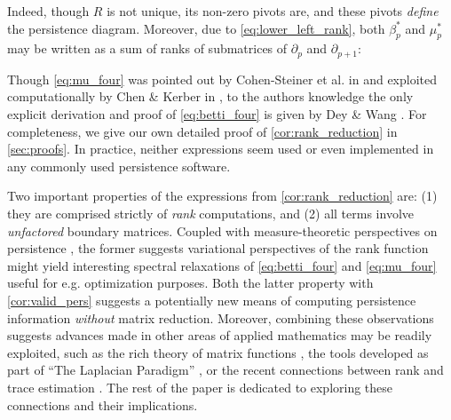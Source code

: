 \documentclass[pdflatex,sn-mathphys-num]{sn-jnl}
\begin{document}

Indeed, though \(R\) is not unique, its non-zero pivots are, and these pivots \emph{define} the persistence diagram. Moreover, due to \ref{eq:lower_left_rank}, both \(\beta_{p}^{\ast}\) and \(\mu_{p}^{\ast}\) may be written as a sum of ranks of submatrices of \(\partial_{p}\) and \(\partial_{p + 1}\):


Though \ref{eq:mu_four} was pointed out by Cohen-Steiner et al. in \cite{cohen2006vines} and exploited computationally by Chen \& Kerber in \cite{chen2011output}, to the authors knowledge the only explicit derivation and proof of \ref{eq:betti_four} is given by Dey \& Wang \cite{dey2022computational}. For completeness, we give our own detailed proof of \ref{cor:rank_reduction} in \ref{sec:proofs}. In practice, neither expressions seem used or even implemented in any commonly used persistence software.

Two important properties of the expressions from \ref{cor:rank_reduction} are: (1) they are comprised strictly of \emph{rank} computations, and (2) all terms involve \emph{unfactored} boundary matrices. Coupled with measure-theoretic perspectives on persistence \cite{chazal2016structure}, the former suggests variational perspectives of the rank function might yield interesting spectral relaxations of \ref{eq:betti_four} and \ref{eq:mu_four} useful for e.g. optimization purposes. Both the latter property with \ref{cor:valid_pers} suggests a potentially new means of computing persistence information \emph{without} matrix reduction. Moreover, combining these observations suggests advances made in other areas of applied mathematics may be readily exploited, such as the rich theory of matrix functions \cite{bhatia2013matrix}, the tools developed as part of ``The Laplacian Paradigm'' \cite{teng2010laplacian}, or the recent connections between rank and trace estimation \cite{ubaru2016fast}. The rest of the paper is dedicated to exploring these connections and their implications.
\end{document}
